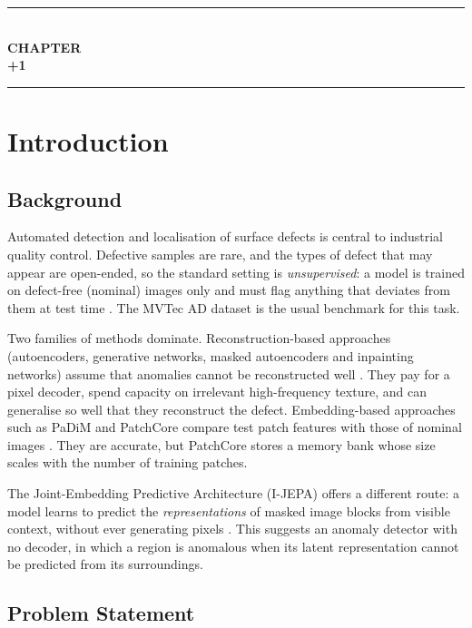 \documentclass[12pt,a4paper,oneside]{report}
\newcommand{\chapterseparator}{
    \clearpage
    \thispagestyle{empty}
    \begin{center}
        \vspace*{5cm}
        \rule{0.65\textwidth}{0.5pt}\\[1.2cm]
        {\fontsize{16}{20}\selectfont\bfseries CHAPTER}\\[0.8cm]
        {\fontsize{24}{28}\selectfont\bfseries \the\numexpr\value{chapter}+1\relax}\\[1.2cm]
        \rule{0.65\textwidth}{0.5pt}
    \end{center}
    \clearpage
}
\begin{document}
\clearpage
{}

\chapterseparator
\chapter{Introduction}

\section{Background}

Automated detection and localisation of surface defects is central to
industrial quality control. Defective samples are rare, and the types of
defect that may appear are open-ended, so the standard setting is
\emph{unsupervised}: a model is trained on defect-free (nominal) images
only and must flag anything that deviates from them at test time
\cite{bergmann2019mvtec,bergmann2021mvtec}. The MVTec AD dataset is the
usual benchmark for this task.

Two families of methods dominate. Reconstruction-based approaches
(autoencoders, generative networks, masked autoencoders and inpainting
networks) assume that anomalies cannot be reconstructed well
\cite{he2022mae,zavrtanik2021inpainting,zavrtanik2021draem}. They pay for a
pixel decoder, spend capacity on irrelevant high-frequency texture, and can
generalise so well that they reconstruct the defect. Embedding-based
approaches such as PaDiM and PatchCore compare test patch features with
those of nominal images \cite{defard2021padim,roth2022patchcore}. They are
accurate, but PatchCore stores a memory bank whose size scales with the
number of training patches.

The Joint-Embedding Predictive Architecture (I-JEPA) offers a different
route: a model learns to predict the \emph{representations} of masked image
blocks from visible context, without ever generating pixels
\cite{assran2023ijepa,lecun2022path}. This suggests an anomaly detector with
no decoder, in which a region is anomalous when its latent representation
cannot be predicted from its surroundings.

\section{Problem Statement}
\end{document}
